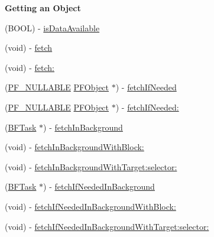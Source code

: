 \begin{Indent}{\bf Getting an Object}\par
{\em 

 

 }\begin{DoxyCompactItemize}
\item 
(B\+O\+O\+L) -\/ \hyperlink{interface_p_f_object_ab6e50a115014722bc4b655dc5823dcbd}{is\+Data\+Available}
\item 
(void) -\/ \hyperlink{interface_p_f_object_a7b078c030aeef4f82e9416e5dc8269bc}{fetch}
\item 
(void) -\/ \hyperlink{interface_p_f_object_adb7db3f147ddf6d8b12e399ba1ac09ee}{fetch\+:}
\item 
(\hyperlink{_p_f_nullability_8h_a528d97a96c5fb279a45c378f5657fca2}{P\+F\+\_\+\+N\+U\+L\+L\+A\+B\+L\+E} \hyperlink{interface_p_f_object}{P\+F\+Object} $\ast$) -\/ \hyperlink{interface_p_f_object_a6f8f5251558096eb6805e8b66c3dedd0}{fetch\+If\+Needed}
\item 
(\hyperlink{_p_f_nullability_8h_a528d97a96c5fb279a45c378f5657fca2}{P\+F\+\_\+\+N\+U\+L\+L\+A\+B\+L\+E} \hyperlink{interface_p_f_object}{P\+F\+Object} $\ast$) -\/ \hyperlink{interface_p_f_object_a0f60160b20bdb15d06ed9bc47ae98871}{fetch\+If\+Needed\+:}
\item 
(\hyperlink{interface_b_f_task}{B\+F\+Task} $\ast$) -\/ \hyperlink{interface_p_f_object_a897a2f3ae0a03adc1e7b6b787a6f1ea3}{fetch\+In\+Background}
\item 
(void) -\/ \hyperlink{interface_p_f_object_a1a9ced242cf3ddc9a97e6361fb6060d2}{fetch\+In\+Background\+With\+Block\+:}
\item 
(void) -\/ \hyperlink{interface_p_f_object_a17ac9dd49c10d4117dfe150686374c66}{fetch\+In\+Background\+With\+Target\+:selector\+:}
\item 
(\hyperlink{interface_b_f_task}{B\+F\+Task} $\ast$) -\/ \hyperlink{interface_p_f_object_a9ebe8f992e414295691558a2833990ee}{fetch\+If\+Needed\+In\+Background}
\item 
(void) -\/ \hyperlink{interface_p_f_object_a6b6b5dfdc2677cca6b1f8c2cb78b9c05}{fetch\+If\+Needed\+In\+Background\+With\+Block\+:}
\item 
(void) -\/ \hyperlink{interface_p_f_object_a3e82d8a156a2a152d45807ad4eca0bab}{fetch\+If\+Needed\+In\+Background\+With\+Target\+:selector\+:}
\end{DoxyCompactItemize}
\end{Indent}
